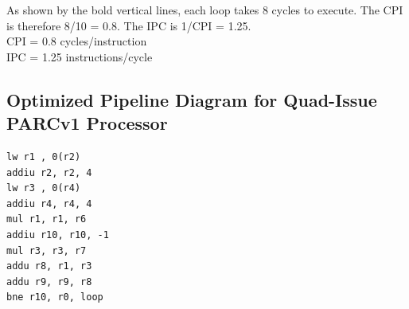 \documentclass[10pt]{article}
\begin{document}
As shown by the bold vertical lines, each loop takes 8 cycles to execute. The CPI is therefore 8/10 = 0.8. The IPC is 1/CPI = 1.25.\\
CPI = 0.8 cycles/instruction\\
IPC = 1.25 instructions/cycle

\subsection{Optimized Pipeline Diagram for Quad-Issue PARCv1 Processor}

\begin{lstlisting}
lw r1 , 0(r2)     
addiu r2, r2, 4   
lw r3 , 0(r4)     
addiu r4, r4, 4   
mul r1, r1, r6    
addiu r10, r10, -1
mul r3, r3, r7    
addu r8, r1, r3   
addu r9, r9, r8   
bne r10, r0, loop                
\end{lstlisting}
\end{document}
